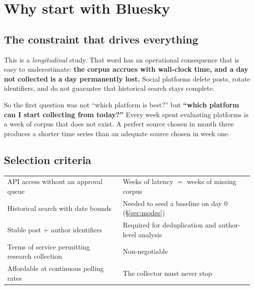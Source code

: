 \documentclass[11pt]{article}
\begin{document}
\vspace{0.5em}
{\small\tableofcontents}
\clearpage

\section{Why start with Bluesky}

\subsection{The constraint that drives everything}

This is a \emph{longitudinal} study. That word has an operational consequence
that is easy to underestimate: \textbf{the corpus accrues with wall-clock time,
and a day not collected is a day permanently lost.} Social platforms delete
posts, rotate identifiers, and do not guarantee that historical search stays
complete.

So the first question was not ``which platform is best?'' but \textbf{``which
platform can I start collecting from today?''} Every week spent evaluating
platforms is a week of corpus that does not exist. A perfect source chosen in
month three produces a shorter time series than an adequate source chosen in
week one.

\subsection{Selection criteria}

\noindent
\begin{tabularx}{\textwidth}{@{}>{\raggedright\arraybackslash}p{} L@{}}
\toprule
{} &  \\
\midrule
API access without an approval queue & Weeks of latency $=$ weeks of missing corpus \\
Historical search with date bounds & Needed to seed a baseline on day 0 (\S\ref{sec:modes}) \\
Stable post + author identifiers & Required for deduplication and author-level analysis \\
Terms of service permitting research collection & Non-negotiable \\
Affordable at continuous polling rates & The collector must never stop \\
\bottomrule
\end{tabularx}
\end{document}
